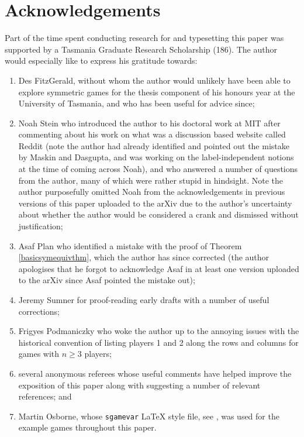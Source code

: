 \documentclass[a4paper, 11pt]{article}
\theoremstyle{paper}
\begin{document}
    \section*{Acknowledgements}
    		Part of the time spent conducting research for and typesetting this paper was supported by a Tasmania Graduate Research Scholarship (186). The author would especially like to express his gratitude towards:
    		\begin{enumerate}
    			\item Des FitzGerald, without whom the author would unlikely have been able to explore symmetric games for the thesis component of his honours year at the University of Tasmania, and who has been useful for advice since;
	    		\item Noah Stein who introduced the author to his doctoral work at MIT after commenting about his work on what was a discussion based website called Reddit (note the author had already identified and pointed out the mistake by Maskin and Dasgupta, and was working on the label-independent notions at the time of coming across Noah), and who answered a number of questions from the author, many of which were rather stupid in hindsight. Note the author purposefully omitted Noah from the acknowledgements in previous versions of this paper uploaded to the arXiv due to the author's uncertainty about whether the author would be considered a crank and dismissed without justification;
	    		\item Asaf Plan who identified a mistake with the proof of Theorem \ref{basicsymequivthm}, which the author has since corrected (the author apologises that he forgot to acknowledge Asaf in at least one version uploaded to the arXiv since Asaf pointed the mistake out);
	    		\item Jeremy Sumner for proof-reading early drafts with a number of useful corrections;
	    		\item Frigyes Podmaniczky who woke the author up to the annoying issues with the historical convention of listing players 1 and 2 along the rows and columns for games with $n \geq 3$ players;
	    		\item several anonymous referees whose useful comments have helped improve the exposition of this paper along with suggesting a number of relevant references; and
	    		\item Martin Osborne, whose {\tt sgamevar} {\LaTeX} style file, see \cite{SGAMESTY}, was used for the example games throughout this paper.
    		\end{enumerate} 
    
    \nocite{GAP4} 
    
    
\end{document}
